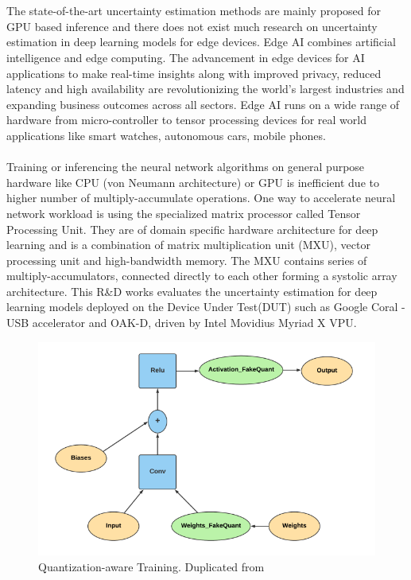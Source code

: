 \documentclass[rnd]{mas_proposal}
\begin{document}
\\\\
The state-of-the-art uncertainty estimation methods are mainly proposed for GPU based inference and there does not exist much research on uncertainty estimation in deep learning models for edge devices. Edge AI combines artificial intelligence and edge computing. The advancement in edge devices for AI applications to make real-time insights along with improved privacy, reduced latency and high availability are revolutionizing the world's largest industries and expanding business outcomes across all sectors. Edge AI runs on a wide range of hardware from micro-controller to tensor processing devices for real world applications like smart watches, autonomous cars, mobile phones.
\\\\
Training or inferencing the neural network algorithms on general purpose hardware like CPU (von Neumann architecture) or GPU is inefficient due to higher number of multiply-accumulate operations\cite{hubara2017quantized}. One way to accelerate neural network workload is using the specialized matrix processor called Tensor Processing Unit. They are of domain specific hardware architecture for deep learning and is a combination of matrix multiplication unit (MXU), vector processing unit and high-bandwidth memory. The MXU contains series of multiply-accumulators, connected directly to each other forming a systolic array architecture. This R\&D works evaluates the uncertainty estimation for deep learning models deployed on the Device Under Test(DUT) such as Google Coral - USB accelerator and OAK-D, driven by Intel Movidius Myriad X VPU.
\begin{figure}[h!]
    \includegraphics[width=\textwidth]{images/QAT.png}
    \caption{Quantization-aware Training. Duplicated from \cite{qunatifi}}
    \label{fig:myfigure}
\end{figure}
\end{document}
